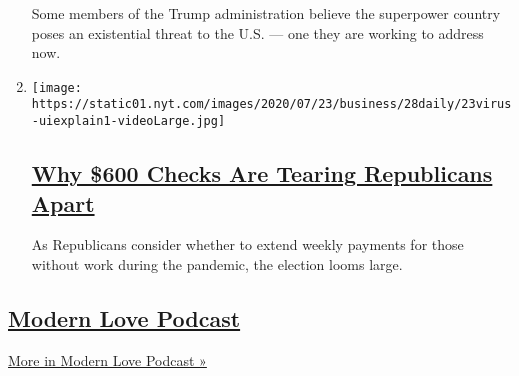 \begin{enumerate}
  Some members of the Trump administration believe the superpower
  country poses an existential threat to the U.S. --- one they are
  working to address now.
\item
  \texttt{[image: https://static01.nyt.com/images/2020/07/23/business/28daily/23virus-uiexplain1-videoLarge.jpg]}

  \hypertarget{why-600-checks-are-tearing-republicans-apart}{%
  \subsection{\texorpdfstring{\href{/2020/07/28/podcasts/the-daily/unemployment-benefits-coronavirus.html}{Why
  \$600 Checks Are Tearing Republicans
  Apart}}{Why \$600 Checks Are Tearing Republicans Apart}}\label{why-600-checks-are-tearing-republicans-apart}}

  As Republicans consider whether to extend weekly payments for those
  without work during the pandemic, the election looms large.
\end{enumerate}

\hypertarget{modern-love-podcast-1}{%
\subsection{\texorpdfstring{\href{/column/modern-love-podcast}{Modern
Love Podcast}}{Modern Love Podcast}}\label{modern-love-podcast-1}}

\href{/column/modern-love-podcast}{More in Modern Love Podcast »}

